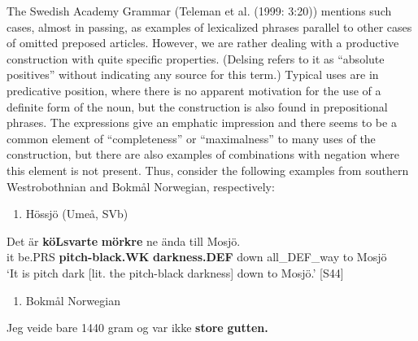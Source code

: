 The Swedish Academy Grammar (Teleman et al. (1999: 3:20)) mentions such cases, almost in passing, as examples of lexicalized phrases parallel to other cases of omitted preposed articles. However, we are rather dealing with a productive construction with quite specific properties. (Delsing refers to it as “absolute positives” without indicating any source for this term.) Typical uses are in predicative position, where there is no apparent motivation for the use of a definite form of the noun, but the construction is also found in prepositional phrases. The expressions give an emphatic impression and there seems to be a common element of “completeness” or “maximalness” to many uses of the construction, but there are also examples of combinations with negation where this element is not present. Thus, consider the following examples from southern Westrobothnian and Bokmål Norwegian, respectively: 

\begin{enumerate} %
\item 
Hössjö (Umeå, SVb)

\end{enumerate} %
\ea\label{}
\gll Det  är  \textbf{köLsvarte}\textbf{  mörkre} ne  ända  till  Mosjö.  \\


it  be.PRS  \textbf{pitch-black.WK} \textbf{darkness.DEF} down  all\_DEF\_way  to  Mosjö  \\ %


‘It is pitch dark [lit. the pitch-black darkness] down to Mosjö.’ [S44]
\z

\begin{enumerate} %
\item 
Bokmål Norwegian

\end{enumerate} %
\ea\label{}
\gll Jeg  veide  bare  1440  gram  og  var  ikke  \textbf{store} \textbf{gutten.}\\


